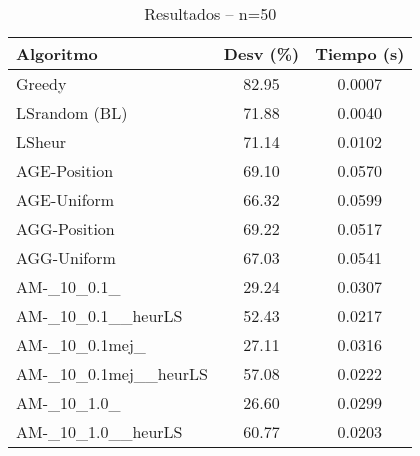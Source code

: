 \begin{table}[ht]
  \centering
  \caption{Resultados – n=50}
  \begin{tabular}{lcc}
  \hline
  Algoritmo & Desv (\%) & Tiempo (s) \\
  \hline
  Greedy & 82.95 & 0.0007 \\
  LSrandom (BL) & 71.88 & 0.0040 \\
  LSheur & 71.14 & 0.0102 \\
  AGE-Position & 69.10 & 0.0570 \\
  AGE-Uniform & 66.32 & 0.0599 \\
  AGG-Position & 69.22 & 0.0517 \\
  AGG-Uniform & 67.03 & 0.0541 \\
  AM-\_10\_0.1\_ & 29.24 & 0.0307 \\
  AM-\_10\_0.1\_\_heurLS & 52.43 & 0.0217 \\
  AM-\_10\_0.1mej\_ & 27.11 & 0.0316 \\
  AM-\_10\_0.1mej\_\_heurLS & 57.08 & 0.0222 \\
  AM-\_10\_1.0\_ & 26.60 & 0.0299 \\
  AM-\_10\_1.0\_\_heurLS & 60.77 & 0.0203 \\
  \hline
  \end{tabular}
\end{table}